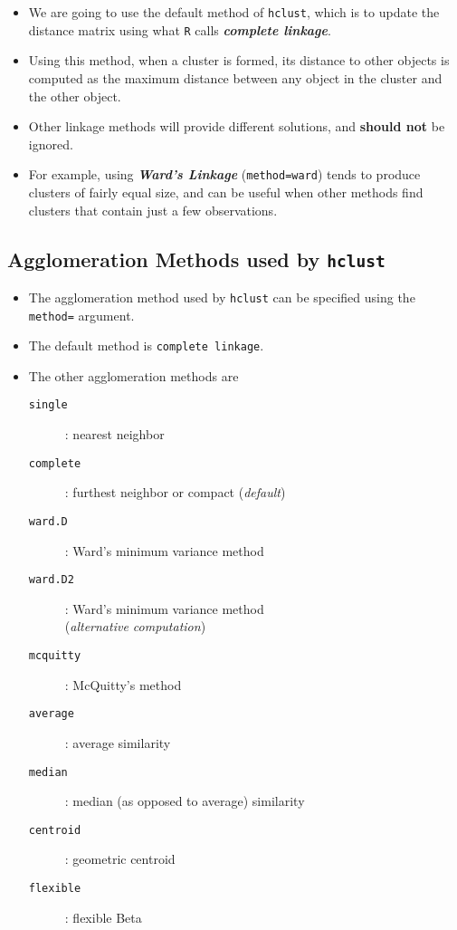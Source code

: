 \documentclass[12pt]{article}
\begin{document}
\begin{itemize} 
	\item We are going to use the default method of \texttt{hclust}, which is to update the distance matrix using what \texttt{R} calls \textbf{\textit{complete linkage}}. 
	\item Using this method, when a cluster is formed, its distance to other objects is computed as the maximum distance between any object in the cluster and the other object. 
	\item Other linkage methods will provide different solutions, and \textbf{should not} be ignored. 
	\item For example, using \textbf{\textit{Ward's Linkage}} (\texttt{method=ward}) tends to produce clusters of fairly equal size, and can be useful when other methods find clusters that contain just a few observations.
\end{itemize}
 

\newpage
\subsection{Agglomeration Methods used by \texttt{hclust}}
\begin{itemize}
\item The agglomeration method used by \texttt{hclust} can be specified using the \texttt{method=} argument.
\item The default method is \texttt{complete linkage}.

\item The other agglomeration methods are
\begin{framed}
\begin{description}
\item[\texttt{single }]: nearest neighbor
\item[\texttt{complete }]: furthest neighbor or compact (\textit{default})
\item[\texttt{ward.D }]:  Ward's minimum variance method
\item[\texttt{ward.D2}]:  Ward's minimum variance method \\ (\textit{alternative computation})
\item[\texttt{mcquitty }]: McQuitty's method
\item[\texttt{average }]: average similarity
\item[\texttt{median }]: median (as opposed to average) similarity
\item[\texttt{centroid }]: geometric centroid
\item[\texttt{flexible }]: flexible Beta
\end{description}
\end{framed}
\end{itemize}
\newpage
\end{document}
